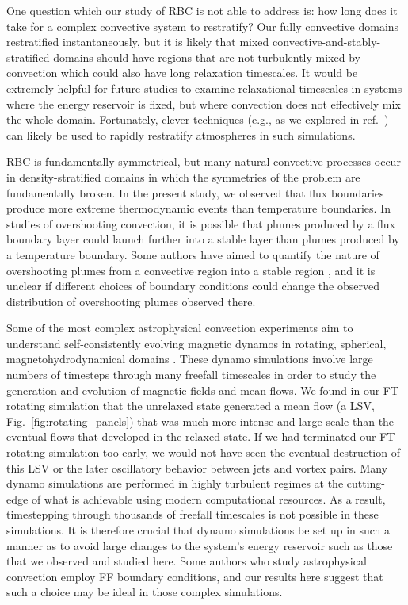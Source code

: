 \documentclass[aps, pre, onecolumn, nofootinbib, notitlepage, groupedaddress, amsfonts, amssymb, amsmath, longbibliography, superscriptaddress]{revtex4-1}
\begin{document}
One question which our study of RBC is not able to address is: how long does it take for a complex convective system to restratify?
Our fully convective domains restratified instantaneously, but it is likely that mixed convective-and-stably-stratified domains \citep{brummell&all2002, kapyla&all2019, pratt&all2017, korre&all2019} should have regions that are not turbulently mixed by convection which could also have long relaxation timescales.
It would be extremely helpful for future studies to examine relaxational timescales in systems where the energy reservoir is fixed, but where convection does not effectively mix the whole domain.
Fortunately, clever techniques (e.g., as we explored in ref.~\cite{anders&all2018}) can likely be used to rapidly restratify atmospheres in such simulations.

RBC is fundamentally symmetrical, but many natural convective processes occur in density-stratified domains in which the symmetries of the problem are fundamentally broken.
In the present study, we observed that flux boundaries produce more extreme thermodynamic events than temperature boundaries.
In studies of overshooting convection, it is possible that plumes produced by a flux boundary layer could launch further into a stable layer than plumes produced by a temperature boundary.
Some authors have aimed to quantify the nature of overshooting plumes from a convective region into a stable region \cite{pratt&all2017, korre&all2019}, and it is unclear if different choices of boundary conditions could change the observed distribution of overshooting plumes observed there.

Some of the most complex astrophysical convection experiments aim to understand self-consistently evolving magnetic dynamos in rotating, spherical, magnetohydrodynamical domains \cite{brown&all2010, yadav&all2016, strugarek&all2017, strugarek&all2018}.
These dynamo simulations involve large numbers of timesteps through many freefall timescales in order to study the generation and evolution of magnetic fields and mean flows.
We found in our FT rotating simulation that the unrelaxed state generated a mean flow (a LSV, Fig.~\ref{fig:rotating_panels}) that was much more intense and large-scale than the eventual flows that developed in the relaxed state.
If we had terminated our FT rotating simulation too early, we would not have seen the eventual destruction of this LSV or the later oscillatory behavior between jets and vortex pairs.
Many dynamo simulations are performed in highly turbulent regimes at the cutting-edge of what is achievable using modern computational resources.
As a result, timestepping through thousands of freefall timescales is not possible in these simulations.
It is therefore crucial that dynamo simulations be set up in such a manner as to avoid large changes to the system's energy reservoir such as those that we observed and studied here.
Some authors who study astrophysical convection \citep{featherstone&hindman2016a, strugarek&all2018, bordwell&all2018, matilsky&all2019} employ FF boundary conditions, and our results here suggest that such a choice may be ideal in those complex simulations.
\end{document}
